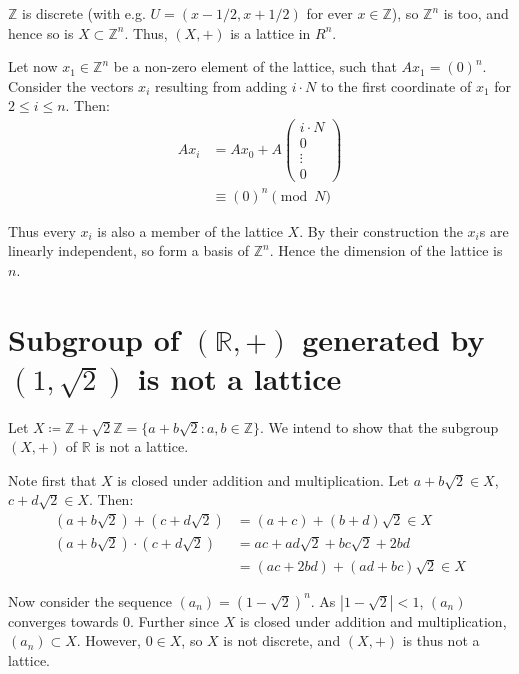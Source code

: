 \documentclass[a4paper]{scrreprt}
\begin{document}
$\mathbb{Z}$ is discrete (with e.g. $U = (x - 1/2, x + 1/2)$ for ever $x \in
\mathbb{Z}$), so $\mathbb{Z}^n$ is too, and hence so is $X \subset
\mathbb{Z}^n$. Thus, $(X, +)$ is a lattice in $R^n$.

Let now $x_1 \in \mathbb{Z}^n$ be a non-zero element of the lattice, such that
$Ax_1 = (0)^n$.  Consider the vectors $x_i$ resulting from adding $i \cdot N$
to the first coordinate of $x_1$ for $2
\leq i \leq n$. Then:
\begin{align*}
		A x_i & = A x_0 + A \begin{pmatrix}
				i \cdot N \\
				0 \\
				\vdots \\
				0
		\end{pmatrix} \\
			  & \equiv (0)^n \pmod{N}
\end{align*}

Thus every $x_i$ is also a member of the lattice $X$. By their construction the
$x_i$s are linearly independent, so form a basis of $\mathbb{Z}^n$. Hence the
dimension of the lattice is $n$.

\section{Subgroup of $(\mathbb{R}, +)$ generated by $(1, \sqrt{2})$ is not a lattice}

Let $X \coloneqq \mathbb{Z} + \sqrt{2} \mathbb{Z} = \{a + b \sqrt{2} : a, b \in
\mathbb{Z}\}$. We intend to show that the subgroup $(X, +)$ of $\mathbb{R}$ is
not a lattice.

Note first that $X$ is closed under addition and multiplication. Let $a + b
\sqrt{2} \in X$, $c + d \sqrt{2} \in X$. Then:
\begin{align*}
		(a + b \sqrt{2}) + (c + d \sqrt{2}) & = (a + c) + (b + d) \sqrt{2} \in X \\
		(a + b \sqrt{2}) \cdot (c + d \sqrt{2}) & = ac + ad \sqrt{2} + bc \sqrt{2} + 2bd \\
												& = (ac + 2bd) + (ad + bc) \sqrt{2} \in X
\end{align*}

Now consider the sequence $(a_n) = \left(1 - \sqrt{2}\right)^n$. As $\left|1 -
\sqrt{2}\right| < 1$, $(a_n)$ converges towards $0$. Further since $X$ is
closed under addition and multiplication, $(a_n) \subset X$. However, $0 \in
X$, so $X$ is not discrete, and $(X, +)$ is thus not a lattice.
\end{document}
